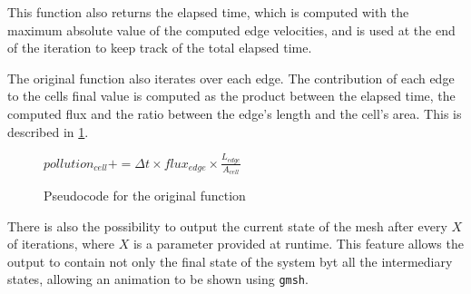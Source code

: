 This function also returns the elapsed time, which is computed with the maximum absolute value of the computed edge velocities, and is used at the end of the iteration to keep track of the total elapsed time.

The original \update function also iterates over each edge. The contribution of each edge to the cells final value is computed as the product between the elapsed time, the computed flux and the ratio between the edge's length and the cell's area. This is described in \cref{alg:update}.

\begin{figure}[!htp]
	\begin{algorithmic}

				$pollution_{cell} += \Delta{t} \times flux_{edge} \times \frac{L_{edge}}{A_{cell}}$
			\EndFor
		\EndFor
	\end{algorithmic}

	\caption{Pseudocode for the original \update function}
	\label{alg:update}
\end{figure}

There is also the possibility to output the current state of the mesh after every $X$ of iterations, where $X$ is a parameter provided at runtime. This feature allows the output to contain not only the final state of the system byt all the intermediary states, allowing  an animation to be shown using \texttt{gmsh}.


